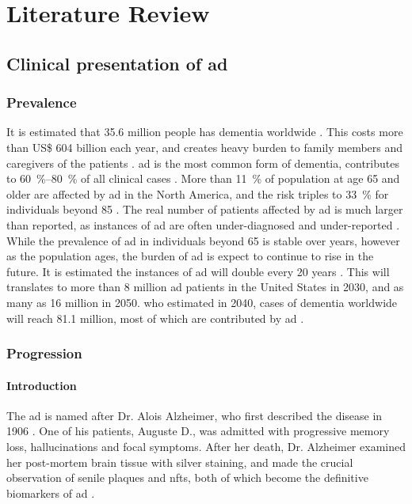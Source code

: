 \chapter{Literature Review}

\section{Clinical presentation of \gls{ad}}
\subsection{Prevalence}
It is estimated that 35.6 million people has dementia worldwide \citep{who13}. This costs more than US\$ 604 billion each year, and creates heavy burden to family members and caregivers of the patients \citep{who13}. \gls{ad} is the most common form of dementia, contributes to \SIrange{60}{80}{\percent}  of all clinical cases \citep{ad16}. More than \SI{11}{\percent} of population at age 65 and older are affected by \gls{ad} in the North America, and the risk triples to \SI{33}{\percent} for individuals beyond 85 \citep{hebert13}. The real number of patients affected by \gls{ad} is much larger than reported, as instances of \gls{ad} are often under-diagnosed and under-reported \citep{barrett06, zaleta12}. While the prevalence of \gls{ad} in individuals beyond 65 is stable over years, however as the population ages, the burden of \gls{ad} is expect to continue to rise in the future. It is estimated the instances of \gls{ad} will double every 20 years \citep{who13, hebert13}. This will translates to more than 8 million \gls{ad} patients in the United States in 2030, and as many as 16 million in 2050. \gls{who} estimated in 2040, cases of dementia worldwide will reach 81.1 million, most of which are contributed by \gls{ad} \citep{who13}. 

\subsection{Progression}
\subsubsection{Introduction}
The \gls{ad} is named after Dr. Alois Alzheimer, who first described the disease in 1906 \citep{goedert06}. One of his patients, Auguste D., was admitted with progressive memory loss, hallucinations and focal symptoms. After her death, Dr. Alzheimer examined her post-mortem brain tissue with silver staining, and made the crucial observation of senile plaques and \glspl{nft}, both of which become the definitive biomarkers of \gls{ad} \citep{goedert06, dubois16}. 
\begin{comment}
\gls{ad} is characterized by progressive decline of memory, learning ability and other cognitive functions. Post-mortem examination of patient's brain is characterized with amyloid plagues, \glspl{nft} and significant loss of neural tissue.
\end{comment}

